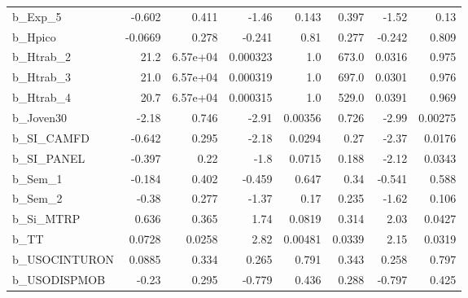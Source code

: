 \begin{tabular}{lrrrrrrr}
b\_Exp\_5       &  -0.602 &    0.411 &     -1.46 &    0.143 &         0.397 &        -1.52 &          0.13 \\
b\_Hpico       & -0.0669 &    0.278 &    -0.241 &     0.81 &         0.277 &       -0.242 &         0.809 \\
b\_Htrab\_2     &    21.2 & 6.57e+04 &  0.000323 &      1.0 &         673.0 &       0.0316 &         0.975 \\
b\_Htrab\_3     &    21.0 & 6.57e+04 &  0.000319 &      1.0 &         697.0 &       0.0301 &         0.976 \\
b\_Htrab\_4     &    20.7 & 6.57e+04 &  0.000315 &      1.0 &         529.0 &       0.0391 &         0.969 \\
b\_Joven30     &   -2.18 &    0.746 &     -2.91 &  0.00356 &         0.726 &        -2.99 &       0.00275 \\
b\_SI\_CAMFD    &  -0.642 &    0.295 &     -2.18 &   0.0294 &          0.27 &        -2.37 &        0.0176 \\
b\_SI\_PANEL    &  -0.397 &     0.22 &      -1.8 &   0.0715 &         0.188 &        -2.12 &        0.0343 \\
b\_Sem\_1       &  -0.184 &    0.402 &    -0.459 &    0.647 &          0.34 &       -0.541 &         0.588 \\
b\_Sem\_2       &   -0.38 &    0.277 &     -1.37 &     0.17 &         0.235 &        -1.62 &         0.106 \\
b\_Si\_MTRP     &   0.636 &    0.365 &      1.74 &   0.0819 &         0.314 &         2.03 &        0.0427 \\
b\_TT          &  0.0728 &   0.0258 &      2.82 &  0.00481 &        0.0339 &         2.15 &        0.0319 \\
b\_USOCINTURON &  0.0885 &    0.334 &     0.265 &    0.791 &         0.343 &        0.258 &         0.797 \\
b\_USODISPMOB  &   -0.23 &    0.295 &    -0.779 &    0.436 &         0.288 &       -0.797 &         0.425 \\
\bottomrule
\end{tabular}


